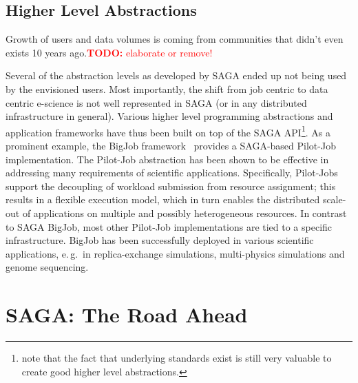 \documentclass[]{article}
\newcommand{\B}[1]{\textbf{#1}}
\newcommand{\todo}[1]{{\textcolor{red}{\B{TODO:} #1 }}}
\newcommand{\jhanote}[1]{{\textcolor{red}{     \B{Shantenu:} #1 }}}
\newcommand{\ownote}[1]{{\textcolor{Brown}{   \B{Ole:     } #1 }}}
\newcommand{\jhanote}[1]{}
\newcommand{\ownote}[1]{}
\begin{document}
 \subsection{Higher Level Abstractions}




  Growth of users and data volumes is coming from communities that
  didn't even exists 10 years ago.\todo{elaborate or remove!}
 
  Several of the abstraction levels as developed by SAGA ended up not
  being used by the envisioned users.  Most importantly, the shift
  from job centric to data centric e-science is not well represented
  in SAGA (or in any distributed infrastructure in general).  Various
  higher level programming abstractions and application frameworks
  have thus been built on top of the SAGA API\footnote{note that the
  fact that underlying standards exist is still very valuable to
  create good higher level abstractions.}.  As a prominent example,
  the BigJob framework~\cite{saga_bigjob_condor_cloud}  provides a
  SAGA-based Pilot-Job implementation. The Pilot-Job abstraction has
  been shown to be effective in addressing many requirements of
  scientific applications.  Specifically, Pilot-Jobs support the
  decoupling of workload submission from resource assignment; this
  results in a flexible execution model, which in turn enables the
  distributed scale-out of applications on multiple and possibly
  heterogeneous resources. In contrast to SAGA BigJob, most other
  Pilot-Job implementations are tied to a specific infrastructure.
  BigJob has been successfully deployed in various scientific
  applications, e.\,g.\ in replica-exchange simulations, multi-physics
  simulations and genome sequencing.


\section{SAGA: The Road Ahead}
\label{sec:road}
\end{document}
